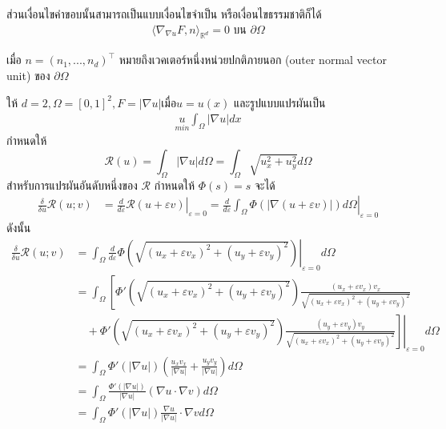 ส่วนเงื่อนไขค่าขอบนั้นสามารถเป็นแบบเงื่อนไขจำเป็น หรือเงื่อนไขธรรมชาติก็ได้
\begin{align*}
    \langle \nabla_{\nabla u} F, n \rangle_{\mathbb{R}^{d}} = 0 \text{ บน } \partial \Omega
\end{align*}

เมื่อ $n = (n_1, ..., n_d)^\top$ หมายถึงเวคเตอร์หนึ่งหน่วยปกติภายนอก (outer normal vector unit) ของ $\partial \Omega$

\begin{Example}
    ให้ $d = 2, \Omega = [0,1]^2, F = |\nabla u| \text{เมื่อ} u = u(x)$ และรูปแบบแปรผันเป็น 
    \begin{align*}
        \underset{min}{u} \int_{\Omega} |\nabla u| dx 
    \end{align*}
    กำหนดให้ \[
        \mathcal{R}(u) = \int_\Omega |\nabla u| d \Omega = \int_\Omega \sqrt{u_x^2+u_y^2} d \Omega
    \]
    สำหรับการแปรผันอันดับหนึ่งของ  $\mathcal{R}$ กำหนดให้ $\Phi (s)=s$ จะได้
    \begin{align*}
    \frac{\delta}{\delta u}\mathcal{R}(u;v) &= \left.\frac{d}{d\varepsilon}\mathcal{R}(u+\varepsilon v) \right|_{\varepsilon = 0} 
    = \left.\frac{d}{d\varepsilon} \int_{\Omega} \Phi (|\nabla (u + \varepsilon v)|)d\Omega 
    \right|_{\varepsilon = 0} 
    \end{align*}
    ดังนั้น
    \begin{align*}
    \frac{\delta}{\delta u}\mathcal{R}(u;v) 
    &= \int_{\Omega} \left.\frac{d}{d\varepsilon} \Phi ({\sqrt{(u_x+\varepsilon v_x)^2 + (u_y+\varepsilon v_y)^2 }})\right|_{\varepsilon = 0} d\Omega \\
    &= \int_{\Omega}^{}\left[\Phi'({\sqrt{(u_x+\varepsilon v_x)^2 + (u_y+\varepsilon v_y)^2 }}) \frac{(u_x+\varepsilon v_x)v_x}{{\sqrt{(u_x+\varepsilon v_x)^2+ (u_y+\varepsilon v_y)^2 }}}\right.\\
    &\quad + \Phi'({\sqrt{(u_x+\varepsilon v_x)^2 + (u_y+\varepsilon v_y)^2 }}) \left.\left.\frac{(u_y+\varepsilon v_y)v_y}{{\sqrt{(u_x+\varepsilon v_x)^2 + (u_y+\varepsilon v_y)^2 }}}\right] \right|_{\varepsilon = 0} d\Omega 
    \\
    &= \int_{\Omega} \Phi'(|\nabla u|)\left(\frac{u_x v_x}{|\nabla u|} + \frac{u_y v_y}{|\nabla u|} \right) d\Omega \\
    &= \int_{\Omega} \frac{\Phi'(|\nabla u|)}{|\nabla u|} (\nabla u \cdot \nabla v)d\Omega \\
    &= \int_{\Omega}\Phi'(|\nabla u|) \frac{\nabla u}{|\nabla u|} \cdot \nabla v d\Omega
    \end{align*}

\end{Example}
